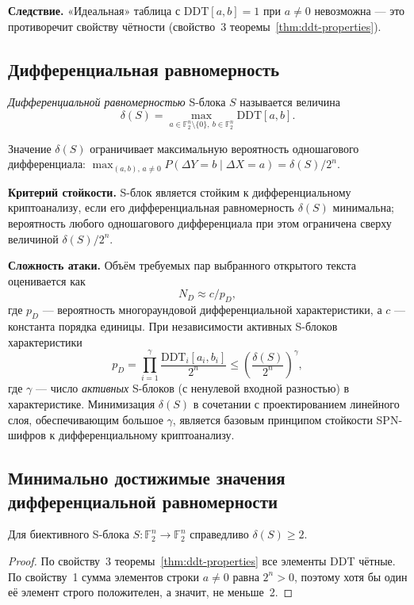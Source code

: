 \textbf{Следствие.} «Идеальная» таблица с $\mathrm{DDT}[a, b] = 1$ при
$a \neq 0$ невозможна — это противоречит свойству чётности (свойство~3
теоремы~\ref{thm:ddt-properties}).

\subsection{Дифференциальная равномерность}

\begin{definition}
\emph{Дифференциальной равномерностью} S-блока $S$ называется величина
\[
    \delta(S) = \max_{a \in \mathbb{F}_2^n \setminus \{0\},\ b \in \mathbb{F}_2^n} \mathrm{DDT}[a, b].
\]
\end{definition}

Значение $\delta(S)$ ограничивает максимальную вероятность одношагового
дифференциала: $\max_{(a,b),\,a\neq 0} P(\Delta Y = b \mid \Delta X = a) = \delta(S) / 2^n$.

\textbf{Критерий стойкости.} S-блок является стойким к дифференциальному
криптоанализу, если его дифференциальная равномерность $\delta(S)$
минимальна; вероятность любого одношагового дифференциала при этом
ограничена сверху величиной $\delta(S) / 2^n$.

\medskip
\textbf{Сложность атаки.} Объём требуемых пар выбранного открытого текста
оценивается как
\[
    N_D \approx c / p_D,
\]
где $p_D$ — вероятность многораундовой дифференциальной характеристики,
а $c$ — константа порядка единицы. При независимости активных S-блоков
характеристики
\[
    p_D = \prod_{i=1}^{\gamma} \frac{\mathrm{DDT}_i[a_i, b_i]}{2^n} \leq \left(\frac{\delta(S)}{2^n}\right)^{\gamma},
\]
где $\gamma$ — число \emph{активных} S-блоков (с ненулевой входной
разностью) в характеристике. Минимизация $\delta(S)$ в сочетании с
проектированием линейного слоя, обеспечивающим большое $\gamma$,
является базовым принципом стойкости SPN-шифров к
дифференциальному криптоанализу.

\subsection{Минимально достижимые значения дифференциальной равномерности}

\begin{theorem}
Для биективного S-блока $S: \mathbb{F}_2^n \to \mathbb{F}_2^n$ справедливо
$\delta(S) \geq 2$.
\end{theorem}

\begin{proof}
По свойству~3 теоремы~\ref{thm:ddt-properties} все элементы DDT чётные.
По свойству~1 сумма элементов строки $a \neq 0$ равна $2^n > 0$,
поэтому хотя бы один её элемент строго положителен, а значит,
не меньше~2.
\end{proof}

